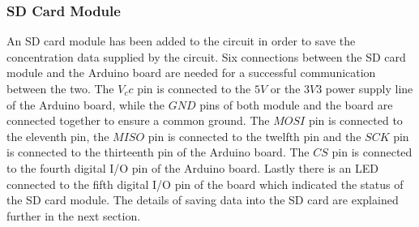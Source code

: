 \subsubsection{SD Card Module}
An SD card module has been added to the circuit in order to save the concentration data supplied by the circuit. Six connections between the SD card module and the Arduino board are needed for a successful communication between the two. The $V_cc$ pin is connected to the $5V$ or the $3V3$ power supply line of the Arduino board, while the $GND$ pins of both module and the board are connected together to ensure a common ground. The $MOSI$ pin is connected to the eleventh pin, the $MISO$ pin is connected to the twelfth pin and the $SCK$ pin is connected to the thirteenth pin of the Arduino board. The $CS$ pin is connected to the fourth digital I/O pin of the Arduino board. Lastly there is an LED connected to the fifth digital I/O pin of the board which indicated the status of the SD card module. The details of saving data into the SD card are explained further in the next section. 



